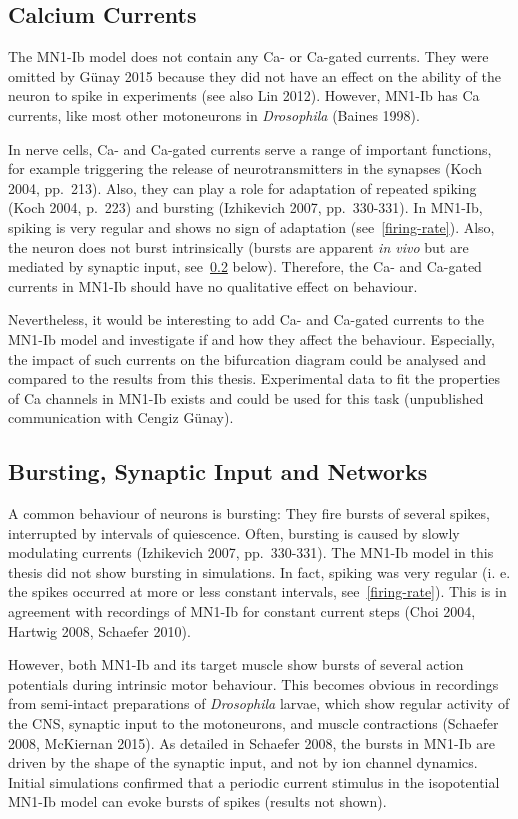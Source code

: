 \documentclass[12pt,a4paper,]{report}
\begin{document}
\subsection{Calcium Currents}\label{calcium-currents}

The MN1-Ib model does not contain any Ca- or Ca-gated currents. They
were omitted by Günay 2015 because they did not have an effect on the
ability of the neuron to spike in experiments (see also Lin 2012).
However, MN1-Ib has Ca currents, like most other motoneurons in
\emph{Drosophila} (Baines 1998).

In nerve cells, Ca- and Ca-gated currents serve a range of important
functions, for example triggering the release of neurotransmitters in
the synapses (Koch 2004, pp.~213). Also, they can play a role for
adaptation of repeated spiking (Koch 2004, p.~223) and bursting
(Izhikevich 2007, pp.~330-331). In MN1-Ib, spiking is very regular and
shows no sign of adaptation (see~\ref{firing-rate}). Also, the neuron
does not burst intrinsically (bursts are apparent \emph{in vivo} but are
mediated by synaptic input, see~\ref{bursting} below). Therefore, the
Ca- and Ca-gated currents in MN1-Ib should have no qualitative effect on
behaviour.

Nevertheless, it would be interesting to add Ca- and Ca-gated currents
to the MN1-Ib model and investigate if and how they affect the
behaviour. Especially, the impact of such currents on the bifurcation
diagram could be analysed and compared to the results from this thesis.
Experimental data to fit the properties of Ca channels in MN1-Ib exists
and could be used for this task (unpublished communication with Cengiz
Günay).

\subsection{Bursting, Synaptic Input and Networks}\label{bursting}

A common behaviour of neurons is bursting: They fire bursts of several
spikes, interrupted by intervals of quiescence. Often, bursting is
caused by slowly modulating currents (Izhikevich 2007, pp.~330-331). The
MN1-Ib model in this thesis did not show bursting in simulations. In
fact, spiking was very regular (i. e. the spikes occurred at more or
less constant intervals, see~\ref{firing-rate}). This is in agreement
with recordings of MN1-Ib for constant current steps (Choi 2004, Hartwig
2008, Schaefer 2010).

However, both MN1-Ib and its target muscle show bursts of several action
potentials during intrinsic motor behaviour. This becomes obvious in
recordings from semi-intact preparations of \emph{Drosophila} larvae,
which show regular activity of the CNS, synaptic input to the
motoneurons, and muscle contractions (Schaefer 2008, McKiernan 2015). As
detailed in Schaefer 2008, the bursts in MN1-Ib are driven by the shape
of the synaptic input, and not by ion channel dynamics. Initial
simulations confirmed that a periodic current stimulus in the
isopotential MN1-Ib model can evoke bursts of spikes (results not
shown).
\end{document}
